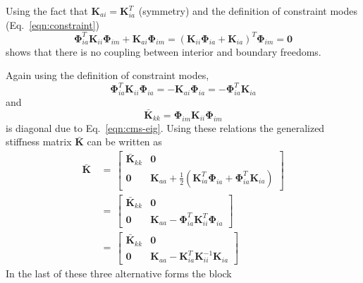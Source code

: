 \documentclass[10pt,openany,twoside]{book}
\numberwithin{equation}{section}   %
\newcommand{\Matrix}[1]{\boldsymbol{#1}}
\newcommand{\Eqn}[1]{Eq.\ \ref{#1}}
\begin{document}
Using the fact that $\Matrix{K}_{ai} = \Matrix{K}_{ia}^T$ (symmetry)
and the definition of constraint modes (\Eqn{eqn:constraint})
\begin{equation}
\Matrix{\Phi}_{ia}^T \Matrix{K}_{ii} \Matrix{\Phi}_{im} + \Matrix{K}_{ai} \Matrix{\Phi}_{im} =
                \left( \Matrix{K}_{ii} \Matrix{\Phi}_{ia} + \Matrix{K}_{ia} \right)^T \Matrix{\Phi}_{im} = \Matrix{0}		\nonumber
\end{equation}
shows that there is no coupling between interior and boundary freedoms.

Again using the definition of constraint modes,
\begin{equation}
\Matrix{\Phi}_{ia}^T \Matrix{K}_{ii} \Matrix{\Phi}_{ia} =
                - \Matrix{K}_{ai} \Matrix{\Phi}_{ia} = - \Matrix{\Phi}_{ia}^T \Matrix{K}_{ia}		\nonumber
\end{equation}
and
\begin{equation}
\Matrix{\bar{K}}_{kk} = \Matrix{\Phi}_{im} \Matrix{K}_{ii} \Matrix{\Phi}_{im}	\nonumber
\end{equation}
is diagonal due to \Eqn{eqn:cms-eig}.
Using these relations the generalized stiffness matrix $\Matrix{\bar{K}}$
can be written as
\begin{equation}
\begin{split}
\Matrix{\bar{K}} & \, = \, \left[
\begin{array}{cc}
   \Matrix{\bar{K}}_{kk} & \Matrix{0} \\
   \Matrix{0} & \Matrix{K}_{aa} + \frac{1}{2} \left( \Matrix{K}_{ia}^T \Matrix{\Phi}_{ia} + \Matrix{\Phi}_{ia}^T \Matrix{K}_{ia} \right)
\end{array}
\right]         \\
 & \, = \, \left[
\begin{array}{cc}
   \Matrix{\bar{K}}_{kk} & \Matrix{0} \\
   \Matrix{0} & \Matrix{K}_{aa} - \Matrix{\Phi}_{ia}^T \Matrix{K}_{ii}^T \Matrix{\Phi}_{ia}
\end{array}
\right]         \\
 & \, = \, \left[
\begin{array}{cc}
   \Matrix{\bar{K}}_{kk} & \Matrix{0} \\
   \Matrix{0} & \Matrix{K}_{aa} - \Matrix{K}_{ia}^T \Matrix{K}_{ii}^{-1} \Matrix{K}_{ia}
\end{array}
\right]
\end{split}			\nonumber
\end{equation}
In the last of these three alternative forms the block
\end{document}
